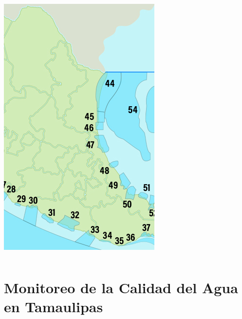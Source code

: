\documentclass[aspectratio=169,compress]{beamer}
\begin{document}
{\begin{columns}
\begin{column}{0.15\textwidth}
\begin{center}
\includegraphics[width=1.00\linewidth]{figs/GiroTamaulipecoX.jpg}\\
\end{center}
\end{column} 
\end{columns} 
}






\section[MCAT]{Monitoreo de la Calidad del Agua en Tamaulipas}
\end{document}
